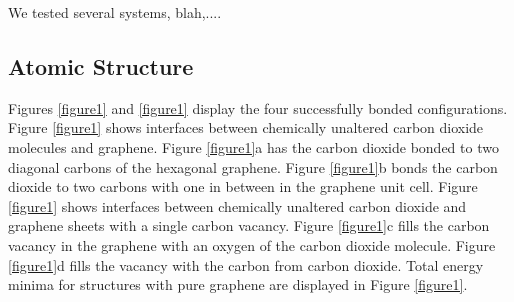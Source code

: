 \documentclass[letterpaper,showpacs,prb,preprint]{revtex4}
\begin{document}
We tested several systems, blah,....


\subsection{Atomic Structure}

Figures \ref{figure1} and \ref{figure1} display the four successfully bonded configurations. 
Figure \ref{figure1} shows interfaces between chemically unaltered carbon dioxide molecules and graphene. 
Figure \ref{figure1}a has the carbon dioxide bonded to two diagonal carbons of the hexagonal graphene. 
Figure \ref{figure1}b bonds the carbon dioxide to two carbons with one in between in the graphene unit cell. 
Figure \ref{figure1} shows interfaces between chemically unaltered carbon dioxide and graphene sheets with a single carbon vacancy. 
Figure \ref{figure1}c fills the carbon vacancy in the graphene with an oxygen of the carbon dioxide molecule. 
Figure \ref{figure1}d fills the vacancy with the carbon from carbon dioxide. 
Total energy minima for structures with pure graphene are displayed in Figure \ref{figure1}.
\end{document}
